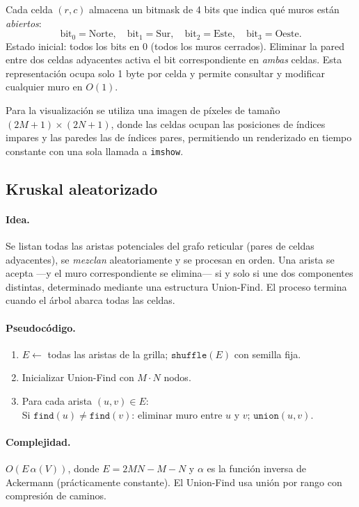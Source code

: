 \documentclass[12pt,a4paper]{article}
\begin{document}
Cada celda $(r,c)$ almacena un bitmask de 4 bits que indica qué muros
están \emph{abiertos}:
\[
  \text{bit}_0 = \text{Norte},\quad
  \text{bit}_1 = \text{Sur},\quad
  \text{bit}_2 = \text{Este},\quad
  \text{bit}_3 = \text{Oeste}.
\]
Estado inicial: todos los bits en 0 (todos los muros cerrados).
Eliminar la pared entre dos celdas adyacentes activa el bit
correspondiente en \emph{ambas} celdas. Esta representación ocupa
solo 1 byte por celda y permite consultar y modificar cualquier muro
en $O(1)$.

Para la visualización se utiliza una imagen de píxeles de tamaño
$(2M+1)\times(2N+1)$, donde las celdas ocupan las posiciones de
índices impares y las paredes las de índices pares, permitiendo un
renderizado en tiempo constante con una sola llamada a \texttt{imshow}.

\subsection{Kruskal aleatorizado}

\paragraph{Idea.}
Se listan todas las aristas potenciales del grafo reticular (pares de
celdas adyacentes), se \emph{mezclan} aleatoriamente y se procesan en
orden. Una arista se acepta ---y el muro correspondiente se elimina---
si y solo si une dos componentes distintas, determinado mediante una
estructura Union-Find. El proceso termina cuando el árbol abarca todas
las celdas.

\paragraph{Pseudocódigo.}
\begin{enumerate}
  \item $E \leftarrow$ todas las aristas de la grilla;\;
        $\texttt{shuffle}(E)$ con semilla fija.
  \item Inicializar Union-Find con $M\cdot N$ nodos.
  \item Para cada arista $(u,v)\in E$:\\
        \quad Si $\texttt{find}(u)\neq\texttt{find}(v)$:
        eliminar muro entre $u$ y $v$;\; $\texttt{union}(u,v)$.
\end{enumerate}

\paragraph{Complejidad.}
$O(E\,\alpha(V))$, donde $E = 2MN - M - N$ y $\alpha$ es la función
inversa de Ackermann (prácticamente constante). El Union-Find usa
unión por rango con compresión de caminos.
\end{document}
